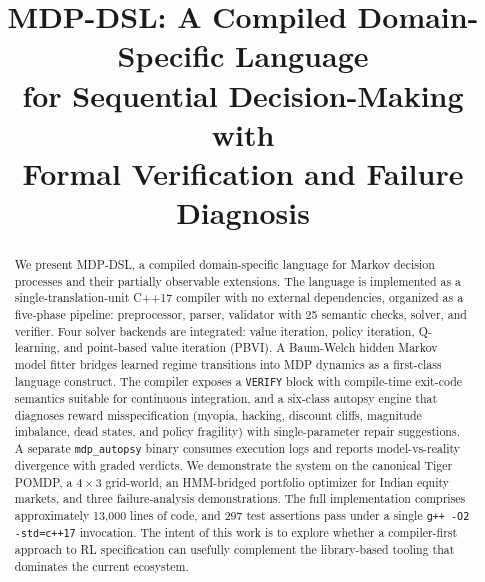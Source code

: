 \documentclass[conference]{IEEEtran}
\begin{document}
\title{MDP-DSL: A Compiled Domain-Specific Language\\
       for Sequential Decision-Making with\\
       Formal Verification and Failure Diagnosis}

\author{
}

\maketitle

\begin{abstract}
We present MDP-DSL, a compiled domain-specific language for Markov
decision processes and their partially observable extensions. The
language is implemented as a single-translation-unit C++17 compiler
with no external dependencies, organized as a five-phase pipeline:
preprocessor, parser, validator with 25 semantic checks, solver, and
verifier. Four solver backends are integrated: value iteration,
policy iteration, Q-learning, and point-based value iteration (PBVI).
A Baum-Welch hidden Markov model fitter bridges learned regime
transitions into MDP dynamics as a first-class language construct.
The compiler exposes a \texttt{VERIFY} block with compile-time
exit-code semantics suitable for continuous integration, and a
six-class autopsy engine that diagnoses reward misspecification
(myopia, hacking, discount cliffs, magnitude imbalance, dead states,
and policy fragility) with single-parameter repair suggestions. A
separate \texttt{mdp\_autopsy} binary consumes execution logs and
reports model-vs-reality divergence with graded verdicts. We
demonstrate the system on the canonical Tiger POMDP, a $4 \times 3$
grid-world, an HMM-bridged portfolio optimizer for Indian equity
markets, and three failure-analysis demonstrations. The full
implementation comprises approximately 13{,}000 lines of code, and
297 test assertions pass under a single \texttt{g++ -O2 -std=c++17}
invocation. The intent of this work is to explore whether a
compiler-first approach to RL specification can usefully complement
the library-based tooling that dominates the current ecosystem.
\end{abstract}
\end{document}

